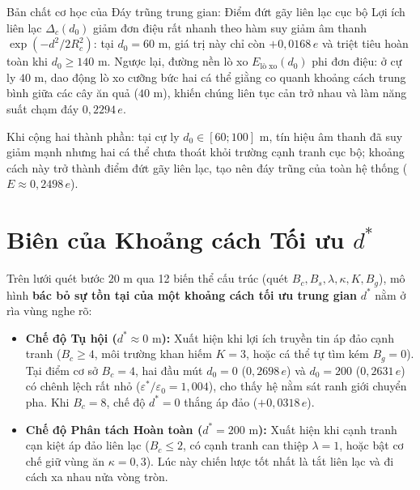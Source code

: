 \documentclass[11pt,a4paper]{report}
\begin{document}
\begin{ketqua}{Bản chất cơ học của Đáy trũng trung gian: Điểm đứt gãy liên lạc cục bộ}
Lợi ích liên lạc $\Delta_c(d_0)$ giảm đơn điệu rất nhanh theo hàm suy giảm âm thanh $\exp(-d^2/2R_c^2)$: tại $d_0 = 60\text{ m}$, giá trị này chỉ còn $+0{,}0168\,e$ và triệt tiêu hoàn toàn khi $d_0 \ge 140\text{ m}$. Ngược lại, đường nền lò xo $E_{\text{lò xo}}(d_0)$ phi đơn điệu: ở cự ly $40\text{ m}$, dao động lò xo cưỡng bức hai cá thể giằng co quanh khoảng cách trung bình giữa các cây ăn quả ($40\text{ m}$), khiến chúng liên tục cản trở nhau và làm năng suất chạm đáy $0{,}2294\,e$.\par\smallskip

Khi cộng hai thành phần: tại cự ly $d_0 \in [60; 100]\text{ m}$, tín hiệu âm thanh đã suy giảm mạnh nhưng hai cá thể chưa thoát khỏi trường cạnh tranh cục bộ; khoảng cách này trở thành điểm đứt gãy liên lạc, tạo nên đáy trũng của toàn hệ thống ($E \approx 0{,}2498\,e$).
\end{ketqua}

\section{Biên của Khoảng cách Tối ưu \texorpdfstring{$d^*$}{d*}}
Trên lưới quét bước $20\text{ m}$ qua 12 biến thể cấu trúc (quét $B_c, B_s, \lambda, \kappa, K, B_g$), mô hình \textbf{bác bỏ sự tồn tại của một khoảng cách tối ưu trung gian} $d^*$ nằm ở rìa vùng nghe rõ:
\begin{itemize}
  \item \textbf{Chế độ Tụ hội ($d^* \approx 0\text{ m}$):} Xuất hiện khi lợi ích truyền tin áp đảo cạnh tranh ($B_c \ge 4$, môi trường khan hiếm $K=3$, hoặc cá thể tự tìm kém $B_g=0$). Tại điểm cơ sở $B_c = 4$, hai đầu mút $d_0 = 0$ ($0{,}2698\,e$) và $d_0 = 200$ ($0{,}2631\,e$) có chênh lệch rất nhỏ ($\varepsilon^*/\varepsilon_0 = 1{,}004$), cho thấy hệ nằm sát ranh giới chuyển pha. Khi $B_c = 8$, chế độ $d^* = 0$ thắng áp đảo ($+0{,}0318\,e$).
  \item \textbf{Chế độ Phân tách Hoàn toàn ($d^* = 200\text{ m}$):} Xuất hiện khi cạnh tranh cạn kiệt áp đảo liên lạc ($B_c \le 2$, có cạnh tranh can thiệp $\lambda = 1$, hoặc bật cơ chế giữ vùng ăn $\kappa = 0{,}3$). Lúc này chiến lược tốt nhất là tắt liên lạc và đi cách xa nhau nửa vòng tròn.
\end{itemize}
\end{document}
